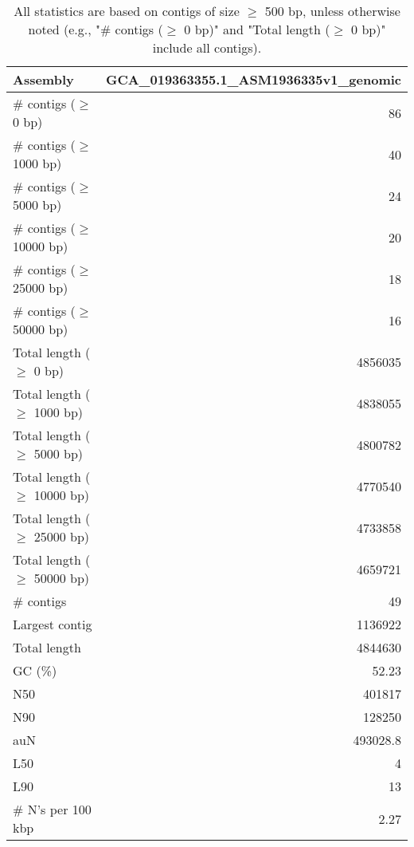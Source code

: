 \documentclass[12pt,a4paper]{article}
\begin{document}
\begin{table}[ht]
\begin{center}
\caption{All statistics are based on contigs of size $\geq$ 500 bp, unless otherwise noted (e.g., "\# contigs ($\geq$ 0 bp)" and "Total length ($\geq$ 0 bp)" include all contigs).}
\begin{tabular}{|l*{1}{|r}|}
\hline
Assembly & GCA\_019363355.1\_ASM1936335v1\_genomic \\ \hline
\# contigs ($\geq$ 0 bp) & 86 \\ \hline
\# contigs ($\geq$ 1000 bp) & 40 \\ \hline
\# contigs ($\geq$ 5000 bp) & 24 \\ \hline
\# contigs ($\geq$ 10000 bp) & 20 \\ \hline
\# contigs ($\geq$ 25000 bp) & 18 \\ \hline
\# contigs ($\geq$ 50000 bp) & 16 \\ \hline
Total length ($\geq$ 0 bp) & 4856035 \\ \hline
Total length ($\geq$ 1000 bp) & 4838055 \\ \hline
Total length ($\geq$ 5000 bp) & 4800782 \\ \hline
Total length ($\geq$ 10000 bp) & 4770540 \\ \hline
Total length ($\geq$ 25000 bp) & 4733858 \\ \hline
Total length ($\geq$ 50000 bp) & 4659721 \\ \hline
\# contigs & 49 \\ \hline
Largest contig & 1136922 \\ \hline
Total length & 4844630 \\ \hline
GC (\%) & 52.23 \\ \hline
N50 & 401817 \\ \hline
N90 & 128250 \\ \hline
auN & 493028.8 \\ \hline
L50 & 4 \\ \hline
L90 & 13 \\ \hline
\# N's per 100 kbp & 2.27 \\ \hline
\end{tabular}
\end{center}
\end{table}
\end{document}
